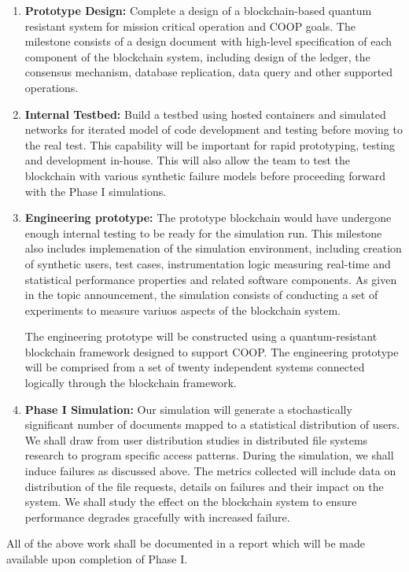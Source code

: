 \begin{enumerate}
\item {\bf Prototype Design:} Complete a design of a blockchain-based quantum resistant system for
mission critical operation and COOP goals. The milestone consists of a design document with high-level specification of
each component of the blockchain system, including design of the ledger, the consensus mechanism, database replication,
data query and other supported operations.


\item {\bf Internal Testbed:} Build a testbed using hosted containers and simulated networks for iterated model of code
development and testing before moving to the real test. This capability will be important for rapid prototyping, testing
and development in-house. This will also allow the team to test the blockchain with various synthetic failure models
before proceeding forward with the Phase I simulations.

\item {\bf Engineering prototype:} The prototype blockchain would have undergone enough internal testing to be ready for
the simulation run. This milestone also includes implemenation of the simulation environment, including creation of
synthetic users, test cases, instrumentation logic measuring real-time and statistical performance properties and
related software components. As given in the topic announcement, the simulation consists of conducting a set of
experiments to measure variuos aspects of the blockchain system. 

The engineering prototype will be constructed using a quantum-resistant blockchain framework designed to
support COOP. The engineering prototype will be comprised from a set of twenty independent systems connected logically
through the blockchain framework. 

\item {\bf Phase I Simulation:}  Our simulation will generate a stochastically significant number of documents mapped to
a statistical distribution of users. We shall draw from user distribution studies in distributed file systems research
to program specific access patterns. During the simulation, we shall induce failures as discussed above. The metrics
collected will include data on distribution of the file requests, details on failures and their impact on the system. We
shall study the effect on the blockchain system to ensure performance degrades gracefully with increased failure.

\end{enumerate}

All of the above work shall be documented in a report which will be made available upon completion of Phase I.
